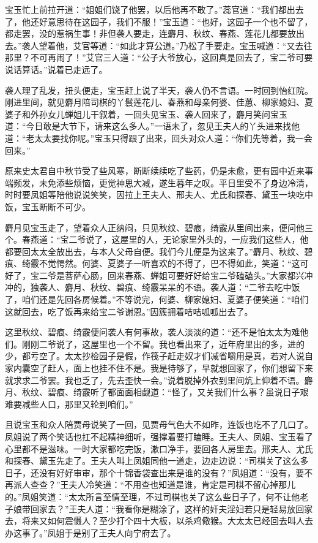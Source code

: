 \documentclass[12pt,oneside]{book}
\begin{document}
宝玉忙上前拉开道：“姐姐们饶了他罢，以后他再不敢了。”蕊官道：“我们都出去了，他还好意思待在这园子，我们不服！”宝玉道：“也好，这园子一个也不留了，都走罢，没的惹祸生事！非但袭人要走，连麝月、秋纹、春燕、莲花儿都要放出去。”袭人望着他，艾官等道：“如此才算公道。”乃松了手要走。宝玉喊道：“又去往那里？不可再闹了！”艾官三人道：“公子大爷放心，这回真是回去了，宝二爷可要说话算话。”说着已走远了。

袭人理了乱发，扭头便走，宝玉赶上说了半天，袭人仍不言语。一时回到怡红院。刚进里间，就见麝月陪司棋的丫鬟莲花儿、春燕和母亲何婆、佳蕙、柳家媳妇、夏婆子和外孙女儿蝉姐儿干叙着，一回头见宝玉、袭人回来了，麝月笑问宝玉道：“今日敢是大节下，请来这么多人。”一语未了，忽见王夫人的丫头进来找他道：“老太太要找你呢。”宝玉只得跟了出来，回头对众人道：“你们先等着，我一会回来。”

原来史太君自中秋节受了些风寒，断断续续吃了些药，仍是未愈，更有园中近来事端频发，未免添些烦恼，更觉神思大减，遂生暮年之叹。平日里受不了身边冷清，时时要凤姐等陪他说说笑笑，因拉上王夫人、邢夫人、尤氏和探春、黛玉一块吃中饭，宝玉断断不可少。

麝月见宝玉走了，望着众人正纳闷，只见秋纹、碧痕，绮霰从里间出来，便问他三个。春燕道：“宝二爷说了，这屋里的人，无论家里外头的，一应我们这些人，他都要回太太全放出去，与本人父母自便。我们今儿便是为这来了。”麝月、秋纹、碧痕、绮霰不觉愕然。何婆、夏婆子一听喜欢的不得了，巴不得如此，笑道：“这可好了，宝二爷是菩萨心肠，回来春燕、蝉姐可要好好给宝二爷磕磕头。”大家都兴冲冲的，独袭人、麝月、秋纹、碧痕、绮霰呆呆的不语。袭人道：“二爷去吃中饭了，咱们还是先回各房候着。”不等说完，何婆、柳家媳妇、夏婆子便笑道：“咱们这就回去，吃了饭再来给宝二爷谢恩。”因簇拥着咭咭呱呱出去了。

这里秋纹、碧痕、绮霰便问袭人有何事故，袭人淡淡的道：“还不是怕太太为难他们。刚刚二爷说了，这屋里也一个不留。我也看出来了，近年府里出的多，进的少，都亏空了。太太抄检园子是假，作筏子赶走奴才们减省嚼用是真，若对人说自家内囊空了赶人，面上也挂不住不是。我是待够了，早就想回家了，你们想留下来就求求二爷罢。我也乏了，先去歪快一会。”说着脱掉外衣到里间炕上仰着不语。麝月、秋纹、碧痕、绮霰听了都面面相觑道：“怪了，又关我们什么事？虽说日子艰难要减些人口，那里又轮到咱们。”

且说宝玉和众人陪贾母说笑了一回，见贾母气色大不如昨，连饭也吃不了几口了。凤姐说了两个笑话也扛不起精神细听，强撑着要打瞌睡。王夫人、凤姐、宝玉看了心里都不是滋味。一时大家都吃完饭，漱口净手，要回各人房里去。邢夫人、尤氏和探春、黛玉先走了。王夫人叫上凤姐同他一道走，边走边说：“司棋关了这么多日子，还没有好好审审，那个十锦香袋查出来是谁的没有？”凤姐道：“没有，要不再派人查查？”王夫人冷笑道：“不用查也知道是谁，肯定是司棋不留心掉那儿的。”凤姐笑道：“太太所言至情至理，不过司棋也关了这么些日子了，何不让他老子娘带回家去？”王夫人道：“我看你是糊涂了，这样的奸夫淫妇若只是轻易放回家去，将来又如何震慑人？至少打个四十大板，以杀鸡儆猴。大太太已经回去叫人去办这事了。”凤姐于是别了王夫人向宁府去了。
\end{document}

